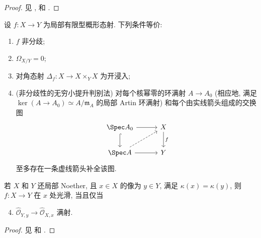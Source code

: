 \begin{proof}
见 \cite[习题 III.$10.3$]{Har77}, \cite[IV$_4$.$17.14.1$--$2$, IV$_4$.$17.6.3$]{EGA} 和 \cite[Tags 02GH, 02HF]{SP}.
\end{proof}
\begin{theorem}[非分歧性的等价条件]\label{src:A.3.3}
设 $f:X\to Y$ 为局部有限型概形态射. 下列条件等价:
\begin{enumerate}[(1)]
\item $f$ 非分歧;
\item $\Omega_{X/Y}=0$;
\item 对角态射 $\Delta_f:X\to X\times_Y X$ 为开浸入;
\item (非分歧性的无穷小提升判别法) 对每个核幂零的环满射 $A\to A_0$ (相应地, 满足 $\ker(A\to A_0)\simeq A/\mathfrak m_A$ 的局部 Artin 环满射) 和每个由实线箭头组成的交换图
\[
\begin{tikzcd}[column sep=3em,row sep=2em]
\Spec A_0\arrow[r]\arrow[d,hook]&X\arrow[d,"f"]\\
\Spec A\arrow[r]\arrow[ur,dashed]&Y
\end{tikzcd}
\]
至多存在一条虚线箭头补全该图.
\end{enumerate}
若 $X$ 和 $Y$ 还局部 Noether, 且 $x\in X$ 的像为 $y\in Y$, 满足 $\kappa(x)=\kappa(y)$, 则 $f:X\to Y$ 在 $x$ 处光滑, 当且仅当
\begin{enumerate}[(1)]\setcounter{enumi}{3}
\item $\widehat{\mathcal O}_{Y,y}\to\widehat{\mathcal O}_{X,x}$ 满射.
\end{enumerate}
\end{theorem}
\begin{proof}
见 \cite[IV$_4$.$17.14.1$--$2$, IV$_4$.$17.6.3$]{EGA} 和 \cite[Tags 02G3, 02H7, 02GE]{SP}.
\end{proof}

